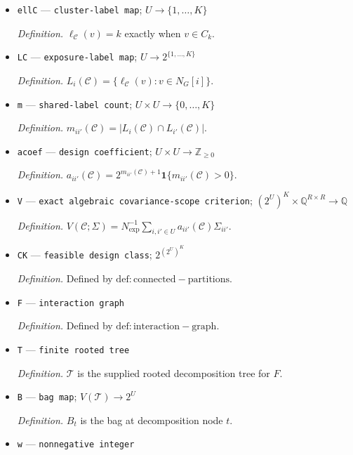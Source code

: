 \documentclass{article}
\begin{document}
\begin{itemize}
  \par\smallskip\noindent\emph{Definition.} \(\mathcal C=(C_1,\ldots,C_K)\).
  \item \texttt{ellC} --- \texttt{cluster-\allowbreak{}label map}; \(U\to\{1,\ldots,K\}\)
  \par\smallskip\noindent\emph{Definition.} \(\ell_{\mathcal C}(v)=k\) exactly when \(v\in C_k\).
  \item \texttt{LC} --- \texttt{exposure-\allowbreak{}label map}; \(U\to 2^{\{1,\ldots,K\}}\)
  \par\smallskip\noindent\emph{Definition.} \(L_i(\mathcal C)=\{\ell_{\mathcal C}(v):v\in N_G[i]\}\).
  \item \texttt{m} --- \texttt{shared-\allowbreak{}label count}; \(U\times U\to\{0,\ldots,K\}\)
  \par\smallskip\noindent\emph{Definition.} \(m_{ii'}(\mathcal C)=|L_i(\mathcal C)\cap L_{i'}(\mathcal C)|\).
  \item \texttt{acoef} --- \texttt{design coefficient}; \(U\times U\to\mathbb Z_{\ge 0}\)
  \par\smallskip\noindent\emph{Definition.} \(a_{ii'}(\mathcal C)=2^{m_{ii'}(\mathcal C)+1}\mathbf 1\{m_{ii'}(\mathcal C)>0\}\).
  \item \texttt{V} --- \texttt{exact algebraic covariance-\allowbreak{}scope criterion}; \((2^U)^K\times\mathbb Q^{R\times R}\to\mathbb Q\)
  \par\smallskip\noindent\emph{Definition.} \(V(\mathcal C;\Sigma)=N_{\exp}^{-1}\sum_{i,i'\in U}a_{ii'}(\mathcal C)\Sigma_{ii'}\).
  \item \texttt{CK} --- \texttt{feasible design class}; \(2^{(2^U)^K}\)
  \par\smallskip\noindent\emph{Definition.} Defined by \(\mathrm{def:connected-partitions}\).
  \item \texttt{F} --- \texttt{interaction graph}
  \par\smallskip\noindent\emph{Definition.} Defined by \(\mathrm{def:interaction-graph}\).
  \item \texttt{T} --- \texttt{finite rooted tree}
  \par\smallskip\noindent\emph{Definition.} \(\mathcal T\) is the supplied rooted decomposition tree for \(F\).
  \item \texttt{B} --- \texttt{bag map}; \(V(\mathcal T)\to 2^U\)
  \par\smallskip\noindent\emph{Definition.} \(B_t\) is the bag at decomposition node \(t\).
  \item \texttt{w} --- \texttt{nonnegative integer}

\end{itemize}
\end{document}
